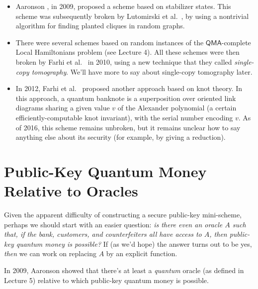 \documentclass[12pt]{report}
\theoremstyle{plain}
\theoremstyle{definition}
\begin{document}
\begin{itemize}
\item Aaronson \cite{Aar09}, in 2009, proposed a scheme based on stabilizer states.  This scheme was subsequently broken by Lutomirski et al.\ \cite{breaking}, by using a nontrivial algorithm for finding planted cliques in random graphs.
\item There were several schemes based on random instances of the $\mathsf{QMA}$-complete Local Hamiltonians problem (see Lecture 4).  All these schemes were then broken by Farhi et al.\ \cite{farhi:restore} in 2010, using a new technique that they called {\em single-copy tomography}.  We'll have more to say about single-copy tomography later.
\item In 2012, Farhi et al.\ \cite{knots} proposed another approach based on knot theory.  In this approach, a quantum banknote is a superposition over oriented link diagrams sharing a given value $v$ of the Alexander polynomial (a certain efficiently-computable knot invariant), with the serial number encoding $v$.  As of 2016, this scheme remains unbroken, but it remains unclear how to say anything else about its security (for example, by giving a reduction).
\end{itemize}

\section{Public-Key Quantum Money Relative to Oracles}

Given the apparent difficulty of constructing a secure public-key mini-scheme, perhaps we should start with an easier question: {\em is there even an oracle $A$ such that, if the bank, customers, and counterfeiters all have access to $A$, then public-key quantum money is possible?}  If (as we'd hope) the answer turns out to be yes, {\em then} we can work on replacing $A$ by an explicit function.

In 2009, Aaronson \cite{Aar09} showed that there's at least a {\em quantum} oracle (as defined in Lecture 5) relative to which public-key quantum money is possible.
\end{document}
